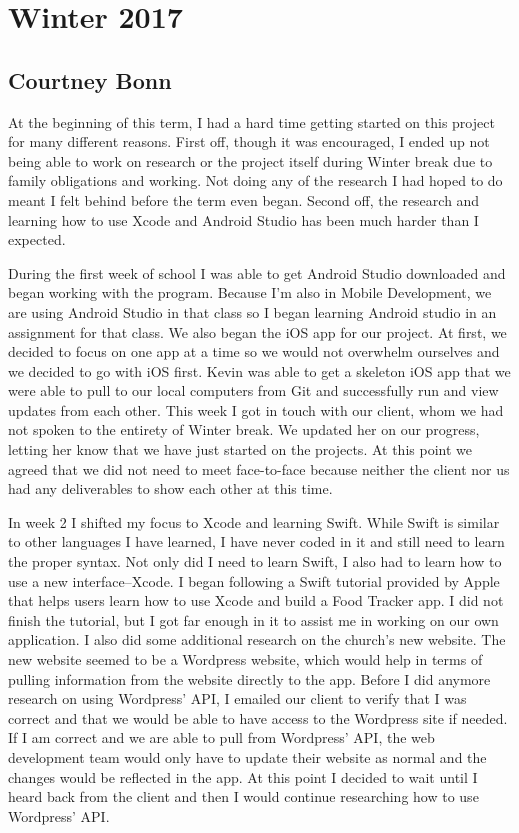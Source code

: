 \documentclass[letterpaper,10pt,draftclsnofoot,onecolumn,titlepage]{IEEEtran}
\begin{document}
	
\section{Winter 2017}

	\subsection{Courtney Bonn}
	At the beginning of this term, I had a hard time getting started on this project for many different reasons.
	First off, though it was encouraged, I ended up not being able to work on research or the project itself during Winter break due to family obligations and working. 
	Not doing any of the research I had hoped to do meant I felt behind before the term even began. 
	Second off, the research and learning how to use Xcode and Android Studio has been much harder than I expected. 
	
	During the first week of school I was able to get Android Studio downloaded and began working with the program. 
	Because I'm also in Mobile Development, we are using Android Studio in that class so I began learning Android studio in an assignment for that class. 
	We also began the iOS app for our project.
	At first, we decided to focus on one app at a time so we would not overwhelm ourselves and we decided to go with iOS first. 
	Kevin was able to get a skeleton iOS app that we were able to pull to our local computers from Git and successfully run and view updates from each other. 
	This week I got in touch with our client, whom we had not spoken to the entirety of Winter break. 
	We updated her on our progress, letting her know that we have just started on the projects. 
	At this point we agreed that we did not need to meet face-to-face because neither the client nor us had any deliverables to show each other at this time. 
	
	In week 2 I shifted my focus to Xcode and learning Swift. 
	While Swift is similar to other languages I have learned, I have never coded in it and still need to learn the proper syntax. 
	Not only did I need to learn Swift, I also had to learn how to use a new interface--Xcode. 
	I began following a Swift tutorial provided by Apple that helps users learn how to use Xcode and build a Food Tracker app. 
	I did not finish the tutorial, but I got far enough in it to assist me in working on our own application.
	I also did some additional research on the church's new website. 
	The new website seemed to be a Wordpress website, which would help in terms of pulling information from the website directly to the app. 
	Before I did anymore research on using Wordpress' API, I emailed our client to verify that I was correct and that we would be able to have access to the Wordpress site if needed. 
	If I am correct and we are able to pull from Wordpress' API, the web development team would only have to update their website as normal and the changes would be reflected in the app. 
	At this point I decided to wait until I heard back from the client and then I would continue researching how to use Wordpress' API. 
	
\end{document}
